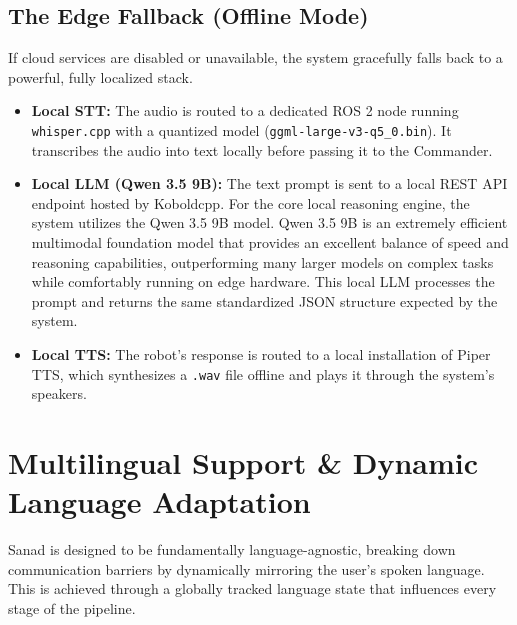 \subsection{The Edge Fallback (Offline Mode)}
If cloud services are disabled or unavailable, the system gracefully falls back to a powerful, fully localized stack.
\begin{itemize}
    \item \textbf{Local STT:} The audio is routed to a dedicated ROS 2 node running \texttt{whisper.cpp} with a quantized model (\texttt{ggml-large-v3-q5\_0.bin}). It transcribes the audio into text locally before passing it to the Commander.
    \item \textbf{Local LLM (Qwen 3.5 9B):} The text prompt is sent to a local REST API endpoint hosted by Koboldcpp. For the core local reasoning engine, the system utilizes the Qwen 3.5 9B model. Qwen 3.5 9B is an extremely efficient multimodal foundation model that provides an excellent balance of speed and reasoning capabilities, outperforming many larger models on complex tasks while comfortably running on edge hardware. This local LLM processes the prompt and returns the same standardized JSON structure expected by the system.
    \item \textbf{Local TTS:} The robot's response is routed to a local installation of Piper TTS, which synthesizes a \texttt{.wav} file offline and plays it through the system's speakers.
\end{itemize}

\section{Multilingual Support \& Dynamic Language Adaptation}
Sanad is designed to be fundamentally language-agnostic, breaking down communication barriers by dynamically mirroring the user's spoken language. This is achieved through a globally tracked language state that influences every stage of the pipeline.

